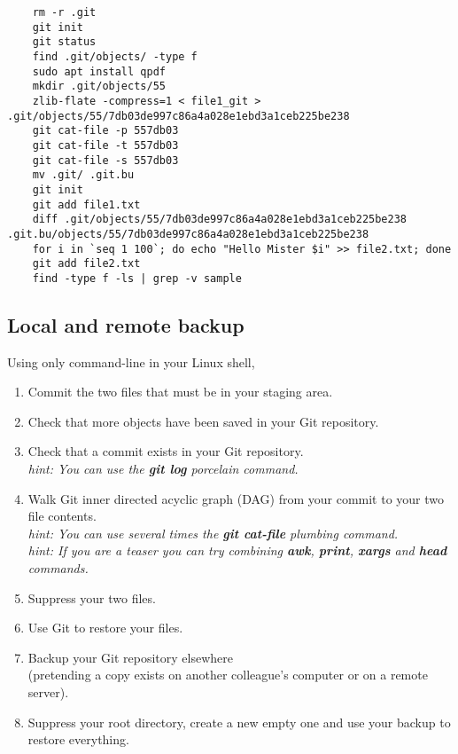\ifdefined\answer
\begin{verbatim}
    rm -r .git
    git init
    git status
    find .git/objects/ -type f
    sudo apt install qpdf
    mkdir .git/objects/55
    zlib-flate -compress=1 < file1_git > .git/objects/55/7db03de997c86a4a028e1ebd3a1ceb225be238
    git cat-file -p 557db03
    git cat-file -t 557db03
    git cat-file -s 557db03
    mv .git/ .git.bu
    git init
    git add file1.txt
    diff .git/objects/55/7db03de997c86a4a028e1ebd3a1ceb225be238 .git.bu/objects/55/7db03de997c86a4a028e1ebd3a1ceb225be238
    for i in `seq 1 100`; do echo "Hello Mister $i" >> file2.txt; done
    git add file2.txt
    find -type f -ls | grep -v sample
\end{verbatim}
\fi

\subsection{Local and remote backup}  %

Using only command-line in your Linux shell,
\begin{enumerate}
    \item Commit the two files that must be in your staging area.
    \item Check that more objects have been saved in your Git repository.
    \item Check that a commit exists in your Git repository. \\
        \textit{hint: You can use the \textbf{git log} porcelain command.}
    \item Walk Git inner directed acyclic graph (DAG) from your commit to your two file contents. \\
        \textit{hint: You can use several times the \textbf{git cat-file} plumbing command.} \\
        \textit{hint: If you are a teaser you can try combining
        \textbf{awk}, \textbf{print}, \textbf{xargs} and \textbf{head} commands.}
    \item Suppress your two files.
    \item Use Git to restore your files.
    \item Backup your Git repository elsewhere \\
          (pretending a copy exists on another colleague's computer or on a remote server).
    \item Suppress your root directory, create a new empty one and use your backup to restore everything.
\end{enumerate}

